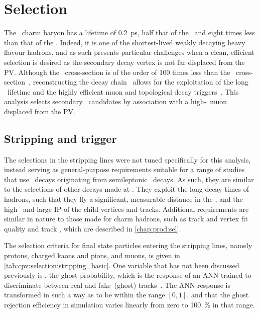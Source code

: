 \chapter{Selection}
\label{chap:cpv:selection}

The \PLambdac\ charm baryon has a lifetime of \SI{0.2}{\pico\second}, half that
of the \PDzero\ and eight times less than that of the \PBzero.
Indeed, it is one of the shortest-lived weakly decaying heavy flavour hadrons,
and as such presents particular challenges when a clean, efficient selection is
desired as the secondary decay vertex is not far displaced from the \ac{PV}.
Although the \bbbar\ cross-section is of the order of 100 times less than the
\ccbar\ cross-section~\cite{LHCb-PAPER-2012-041,LHCb-PAPER-2013-004},
reconstructing the decay chain \LbToLcmuX\ allows for the exploitation of the
long \PLambdab\ lifetime and the highly efficient muon and topological \Pbottom
decay triggers~\cite{Gligorov:1384380,Gligorov:2011qxa}.
This analysis selects secondary \PLambdac\ candidates by association with a
high-\pT\ muon displaced from the \ac{PV}.

\section{Stripping and trigger}
\label{chap:cpv:selection:stripping_trigger}

The selections in the stripping lines were not tuned specifically for this
analysis, instead serving as general-purpose requirements suitable for a range
of studies that use \LcTophh\ decays originating from semileptonic \PLambdab\
decays.
As such, they are similar to the selections of other \Pbottom decays made at
\lhcb.
They exploit the long decay times of \Pbottom hadrons, such that they fly a
significant, measurable distance in the \velo, and the high \pT\ and large
\acl{IP} of the child vertices and tracks.
Additional requirements are similar in nature to those made for charm hadrons,
such as track and vertex fit quality and track \ipchisq, which are described in
\cref{chap:prod:sel}.

The selection criteria for final state particles entering the stripping lines,
namely protons, charged kaons and pions, and muons, is given in
\cref{tab:cpv:selection:stripping_basic}.
One variable that has not been discussed previously is \pghost, the ghost
probability, which is the response of an \ac{ANN} trained to discriminate
between real and fake~(ghost) tracks~\cite{Brehmer:1478372}.
The \ac{ANN} response is transformed in such a way as to be within the range
$[0, 1]$, and that the ghost rejection efficiency in simulation varies linearly
from zero to \SI{100}{\percent} in that range.

